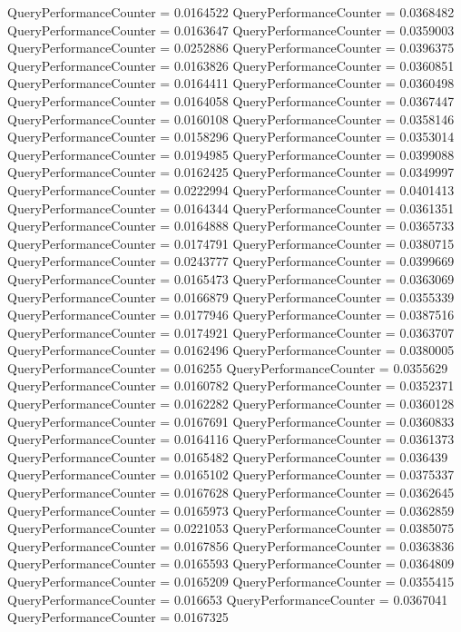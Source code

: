 \documentclass[9pt]{article}
\theoremstyle{plain}
\theoremstyle{definition}
\theoremstyle{remark}
\numberwithin{equation}{section}
\begin{document}
QueryPerformanceCounter  =  0.0164522
QueryPerformanceCounter  =  0.0368482
QueryPerformanceCounter  =  0.0163647
QueryPerformanceCounter  =  0.0359003
QueryPerformanceCounter  =  0.0252886
QueryPerformanceCounter  =  0.0396375
QueryPerformanceCounter  =  0.0163826
QueryPerformanceCounter  =  0.0360851
QueryPerformanceCounter  =  0.0164411
QueryPerformanceCounter  =  0.0360498
QueryPerformanceCounter  =  0.0164058
QueryPerformanceCounter  =  0.0367447
QueryPerformanceCounter  =  0.0160108
QueryPerformanceCounter  =  0.0358146
QueryPerformanceCounter  =  0.0158296
QueryPerformanceCounter  =  0.0353014
QueryPerformanceCounter  =  0.0194985
QueryPerformanceCounter  =  0.0399088
QueryPerformanceCounter  =  0.0162425
QueryPerformanceCounter  =  0.0349997
QueryPerformanceCounter  =  0.0222994
QueryPerformanceCounter  =  0.0401413
QueryPerformanceCounter  =  0.0164344
QueryPerformanceCounter  =  0.0361351
QueryPerformanceCounter  =  0.0164888
QueryPerformanceCounter  =  0.0365733
QueryPerformanceCounter  =  0.0174791
QueryPerformanceCounter  =  0.0380715
QueryPerformanceCounter  =  0.0243777
QueryPerformanceCounter  =  0.0399669
QueryPerformanceCounter  =  0.0165473
QueryPerformanceCounter  =  0.0363069
QueryPerformanceCounter  =  0.0166879
QueryPerformanceCounter  =  0.0355339
QueryPerformanceCounter  =  0.0177946
QueryPerformanceCounter  =  0.0387516
QueryPerformanceCounter  =  0.0174921
QueryPerformanceCounter  =  0.0363707
QueryPerformanceCounter  =  0.0162496
QueryPerformanceCounter  =  0.0380005
QueryPerformanceCounter  =  0.016255
QueryPerformanceCounter  =  0.0355629
QueryPerformanceCounter  =  0.0160782
QueryPerformanceCounter  =  0.0352371
QueryPerformanceCounter  =  0.0162282
QueryPerformanceCounter  =  0.0360128
QueryPerformanceCounter  =  0.0167691
QueryPerformanceCounter  =  0.0360833
QueryPerformanceCounter  =  0.0164116
QueryPerformanceCounter  =  0.0361373
QueryPerformanceCounter  =  0.0165482
QueryPerformanceCounter  =  0.036439
QueryPerformanceCounter  =  0.0165102
QueryPerformanceCounter  =  0.0375337
QueryPerformanceCounter  =  0.0167628
QueryPerformanceCounter  =  0.0362645
QueryPerformanceCounter  =  0.0165973
QueryPerformanceCounter  =  0.0362859
QueryPerformanceCounter  =  0.0221053
QueryPerformanceCounter  =  0.0385075
QueryPerformanceCounter  =  0.0167856
QueryPerformanceCounter  =  0.0363836
QueryPerformanceCounter  =  0.0165593
QueryPerformanceCounter  =  0.0364809
QueryPerformanceCounter  =  0.0165209
QueryPerformanceCounter  =  0.0355415
QueryPerformanceCounter  =  0.016653
QueryPerformanceCounter  =  0.0367041
QueryPerformanceCounter  =  0.0167325
\end{document}
